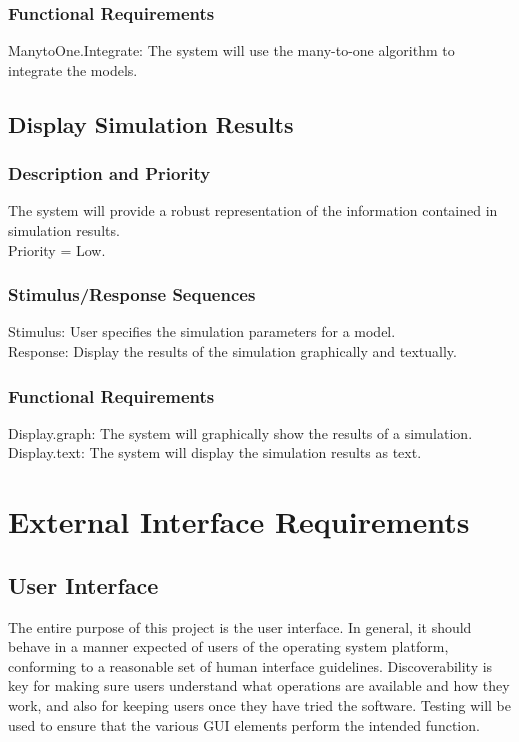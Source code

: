 \documentclass{article}
\begin{document}
\subsubsection{Functional Requirements}
ManytoOne.Integrate: The system will use the many-to-one algorithm to integrate the models.

\subsection{Display Simulation Results}
\subsubsection{Description and Priority}
The system will provide a robust representation of the information contained in simulation results.\\
Priority = Low.

\subsubsection{Stimulus/Response Sequences}
Stimulus: User specifies the simulation parameters for a model.\\
Response: Display the results of the simulation graphically and textually.

\subsubsection{Functional Requirements}
Display.graph: The system will graphically show the results of a simulation.\\
Display.text: The system will display the simulation results as text.

\section{External Interface Requirements}
\subsection{User Interface}
The entire purpose of this project is the user interface. In general, it should behave in a manner expected of users of the operating system platform, conforming to a reasonable set of human interface guidelines. Discoverability is key for making sure users understand what operations are available and how they work, and also for keeping users once they have tried the software. Testing will be used to ensure that the various GUI elements perform the intended function.
\end{document}
